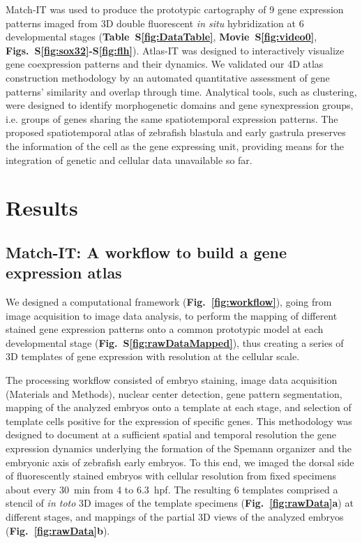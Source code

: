 Match-IT was used to produce the prototypic cartography of 9 gene expression patterns imaged from 3D double fluorescent \emph{in situ} hybridization at 6 developmental stages (\textbf{Table~S\ref{fig:DataTable}}, \textbf{Movie~S\ref{fig:video0}}, \textbf{Figs.~S\ref{fig:sox32}-S\ref{fig:flh}}). Atlas-IT was designed to interactively visualize gene coexpression patterns and their dynamics. We validated our 4D atlas construction methodology by an automated quantitative assessment of gene patterns' similarity and overlap through time. Analytical tools, such as clustering, were designed to identify morphogenetic domains and gene synexpression groups, i.e. groups of genes sharing the same spatiotemporal expression patterns. The proposed spatiotemporal atlas of zebrafish blastula and early gastrula preserves the information of the cell as the gene expressing unit, providing means for the integration of genetic and cellular data unavailable so far.




\section*{Results}



\subsection*{Match-IT: A workflow to build a gene expression atlas}

\label{subsec:Match-IT}



We designed a computational framework (\textbf{Fig.~\ref{fig:workflow}}), going from image acquisition to image data analysis, to perform the mapping of different stained gene expression patterns onto a common prototypic model at each developmental stage (\textbf{Fig.~S\ref{fig:rawDataMapped}}), thus creating a series of 3D templates of gene expression with resolution at the cellular scale.



The processing workflow consisted of embryo staining, image data acquisition (Materials and Methods), nuclear center detection, gene pattern segmentation, mapping of the analyzed embryos onto a template at each stage, and selection of template cells positive for the expression of specific genes. This methodology was designed to document at a sufficient spatial and temporal resolution the gene expression dynamics underlying the formation of the Spemann organizer and the embryonic axis of zebrafish early embryos. To this end, we imaged the dorsal side of fluorescently stained embryos with cellular resolution from fixed specimens about every 30~min from 4 to 6.3~hpf. The resulting 6 templates comprised a stencil of \emph{in toto} 3D images of the template specimens (\textbf{Fig.~\ref{fig:rawData}a}) at different stages, and mappings of the partial 3D views of the analyzed embryos (\textbf{Fig.~\ref{fig:rawData}b}).



